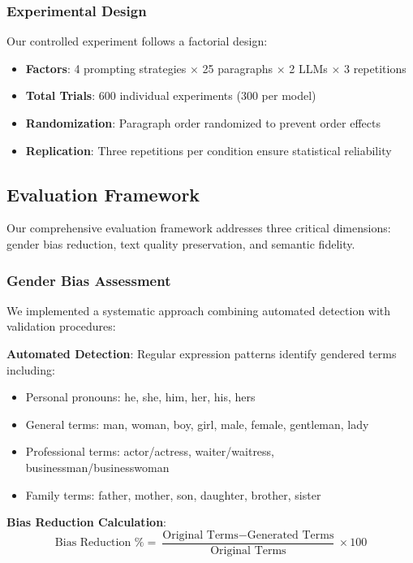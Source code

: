 \subsubsection{Experimental Design}
Our controlled experiment follows a factorial design:
\begin{itemize}
    \item \textbf{Factors}: 4 prompting strategies × 25 paragraphs × 2 LLMs × 3 repetitions
    \item \textbf{Total Trials}: 600 individual experiments (300 per model)
    \item \textbf{Randomization}: Paragraph order randomized to prevent order effects
    \item \textbf{Replication}: Three repetitions per condition ensure statistical reliability
\end{itemize}

\subsection{Evaluation Framework}

Our comprehensive evaluation framework addresses three critical dimensions: gender bias reduction, text quality preservation, and semantic fidelity.

\subsubsection{Gender Bias Assessment}
We implemented a systematic approach combining automated detection with validation procedures:

\textbf{Automated Detection}: Regular expression patterns identify gendered terms including:
\begin{itemize}
    \item Personal pronouns: he, she, him, her, his, hers
    \item General terms: man, woman, boy, girl, male, female, gentleman, lady
    \item Professional terms: actor/actress, waiter/waitress, businessman/businesswoman
    \item Family terms: father, mother, son, daughter, brother, sister
\end{itemize}

\textbf{Bias Reduction Calculation}:
\begin{equation}
\text{Bias Reduction \%} = \frac{\text{Original Terms} - \text{Generated Terms}}{\text{Original Terms}} \times 100
\end{equation}

